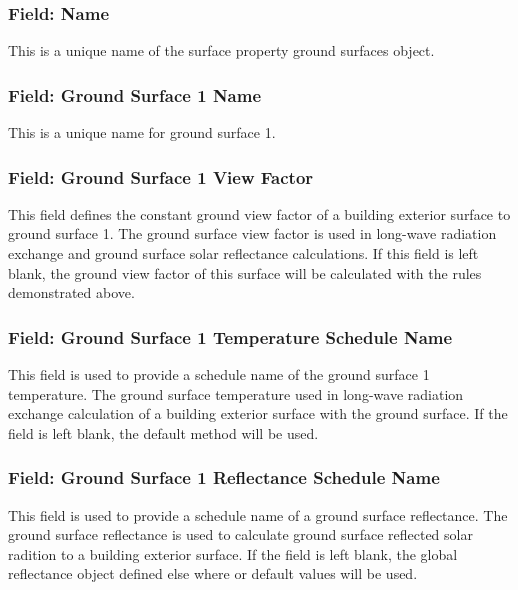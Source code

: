 \subsubsection{Field: Name}\label{field-gnd-surfs-name}

This is a unique name of the surface property ground surfaces object.

\subsubsection{Field: Ground Surface 1 Name}\label{field-ground-surface-1-name}

This is a unique name for ground surface 1. 

\subsubsection{Field: Ground Surface 1 View Factor}\label{field-ground-surface-1-view-factor}

This field defines the constant ground view factor of a building exterior surface to ground surface 1. The ground surface view factor is used in long-wave radiation exchange and ground surface solar reflectance calculations. If this field is left blank, the ground view factor of this surface will be calculated with the rules demonstrated above.

\subsubsection{Field: Ground Surface 1 Temperature Schedule Name}\label{field-ground-surface-1-temp-schedule-name}

This field is used to provide a schedule name of the ground surface 1 temperature. The ground surface temperature used in long-wave radiation exchange calculation of a building exterior surface with the ground surface. If the field is left blank, the default method will be used.

\subsubsection{Field: Ground Surface 1 Reflectance Schedule Name}\label{field-ground-surface-1-reflectance-schedule-name}

This field is used to provide a schedule name of a ground surface reflectance. The ground surface reflectance is used to calculate ground surface reflected solar radition to a building exterior surface. If the field is left blank, the global reflectance object defined else where or default values will be used.

